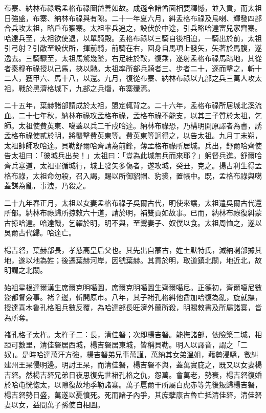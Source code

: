 \begin{pinyinscope}
布寨、納林布祿誘孟格布祿圖岱善如故。成遜令諸酋面相要釋憾，並入貢，而太祖日強盛，布寨、納林布祿與有隙。二十一年夏六月，糾孟格布祿及烏喇、輝發四部合兵攻太祖，略戶布察寨。太祖率兵追之，設伏於中途，引兵略哈達富兒家齊寨。哈達兵至，太祖欲使退，以單騎殿。孟格布祿以三騎自後相迫，一騎出於前，太祖引弓射？引敵至設伏所，揮前騎，前騎在右，回身自馬項上發矢，矢著於馬腹，遂逸去。三騎驟至，太祖馬驚幾墜，右足絓於鞍，復乘，遂射孟格布祿馬踣地，其從者秦穆布祿授以己馬，挾以馳。太祖率所部兵騎者三、步者二十，逐而擊之，斬十二人，獲甲六、馬十八，以還。九月，復從布寨、納林布祿以九部之兵三萬人攻太祖，戰於黑濟格城下，九部之兵熸，布寨殲焉。

二十五年，葉赫諸部請成於太祖，盟定輒背之。二十六年，孟格布祿所居城北溪流血。二十七年秋，納林布祿攻孟格布祿，孟格布祿不能支，以其三子質於太祖，乞師。太祖使費英東、噶蓋以兵二千戍哈達。納林布祿恐，乃構明開原譯者為書，誘孟格布祿使貳於明，將襲擊費英東等。費英東等詗得之，以告太祖。九月丁未朔，太祖帥師攻哈達。貝勒舒爾哈齊請為前鋒，薄孟格布祿所居城。兵出，舒爾哈齊使告太祖曰：「彼城兵出矣！」太祖曰：「豈為此城無兵而來耶？」躬督兵進。舒爾哈齊兵塞道，太祖軍循城行，城上發矢多傷者，遂攻城，癸丑，克之。揚古利生得孟格布祿，太祖命勿殺，召入謁，賜以所御貂帽、豹裘，置帳中。既，孟格布祿與噶蓋謀為亂，事洩，乃殺之。

二十九年春正月，太祖以女妻孟格布祿子吳爾古代，明使來讓，太祖遣吳爾古代還所部。納林布祿歸所掠敕六十道，請於明，補雙貢如故事。已而，納林布祿復糾蒙古掠哈達。哈達饑，乞糴於明，明不與，至鬻妻子、奴僕以食。太祖周恤之，遂以吳爾古代歸。哈達亡。

楊吉砮，葉赫部長，孝慈高皇后父也。其先出自蒙古，姓土默特氏，滅納喇部據其地，遂以地為姓；後遷葉赫河岸，因號葉赫。其貢於明，取道鎮北關，地近北，故明謂之北關。

始祖星根達爾漢生席爾克明噶圖，席爾克明噶圖生齊爾噶尼。正德初，齊爾噶尼數盜都督僉事。褚？邊，斬開原市。八年，其子褚孔格糾他酋加哈復為亂，旋就撫，授達喜木魯孔格阻兵數反覆，為哈達部長旺濟外蘭所殺，明賜敕書及所屬諸寨，皆為所奪。

褚孔格子太杵。太杵子二：長，清佳砮；次即楊吉砮。能撫諸部，依險築二城，相距可數里，清佳砮居西城，楊吉砮居東城，皆稱貝勒。明人以譯音，謂之「二奴」。是時哈達萬汗方強，楊吉砮弟兄事萬謹，萬納其女弟溫姐，藉勢浸驕，數糾建州王杲侵明邊。明討王杲，而清佳砮，楊吉砮不與，蓋萬實庇之，既又以女妻楊吉砮。然楊吉砮兄弟日夜思復先世褚孔格之仇，怨萬。會萬老，勢衰，楊吉砮復婚於哈屯恍惚太，以隙復故地季勒諸寨。萬子扈爾干所屬白虎赤等先後叛歸楊吉砮，楊吉砮勢日盛，萬遂以憂憤死。死而諸子內爭，其庶孽康古魯亡抵清佳砮，清佳砮妻以女，益間萬子孫使自相圖。


\end{pinyinscope}
